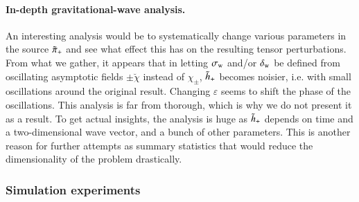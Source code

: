     \paragraph{In-depth gravitational-wave analysis.} %
    An interesting analysis would be to systematically change various parameters in the source $\tilde{\pi}_+$ and see what effect this has on the resulting tensor perturbations. From what we gather, it appears that in letting $\sigma_\mathrm{w}$ and/or $\delta_\mathrm{w}$ be defined from oscillating asymptotic fields $\pm \breve{\chi}$ instead of $\chi_\pm$, $\tilde{h}_+$ becomes noisier, i.e. with small oscillations around the original result. Changing $\varepsilon$ seems to shift the phase of the oscillations. This analysis is far from thorough, which is why we do not present it as a result. To get actual insights, the analysis is huge as $\tilde{h}_+$ depends on time and a two-dimensional wave vector, and a bunch of other parameters. This is another reason for further attempts as summary statistics that would reduce the dimensionality of the problem drastically. 





    \subsubsection{Simulation experiments}





